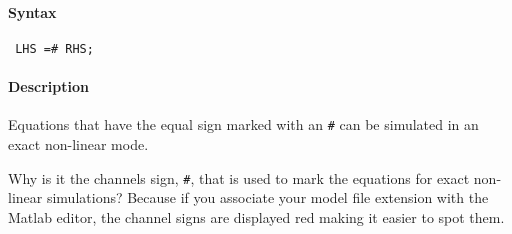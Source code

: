 


	\paragraph{Syntax}
 
 \begin{verbatim}
 LHS =# RHS;
 \end{verbatim}
 
 \paragraph{Description}
 
 Equations that have the equal sign marked with an \texttt{\#} can be
 simulated in an exact non-linear mode.
 
 Why is it the channels sign, \texttt{\#}, that is used to mark the
 equations for exact non-linear simulations? Because if you associate
 your model file extension with the Matlab editor, the channel signs are
 displayed red making it easier to spot them.


